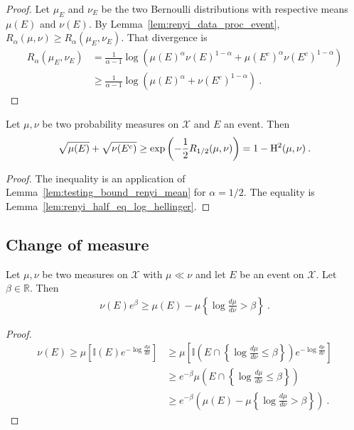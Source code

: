 \begin{proof}
Let $\mu_E$ and $\nu_E$ be the two Bernoulli distributions with respective means $\mu(E)$ and $\nu(E)$.
By Lemma~\ref{lem:renyi_data_proc_event}, $R_\alpha(\mu, \nu) \ge R_\alpha(\mu_E, \nu_E)$. That divergence is
\begin{align*}
R_\alpha(\mu_E, \nu_E)
&= \frac{1}{\alpha - 1}\log \left(\mu(E)^\alpha \nu(E)^{1 - \alpha}
  + \mu(E^c)^\alpha \nu(E^c)^{1 - \alpha}\right)
\\
&\ge \frac{1}{\alpha - 1}\log \left(\mu(E)^\alpha + \nu(E^c)^{1 - \alpha}\right)
\: .
\end{align*}
\end{proof}

\begin{corollary}
  \label{cor:testing_bound_hellinger}
  Let $\mu, \nu$ be two probability measures on $\mathcal X$ and $E$ an event. Then
  \begin{align*}
  \sqrt{\mu(E)} + \sqrt{\nu(E^c)}
  \ge \exp\left(-\frac{1}{2} R_{1/2}(\mu, \nu)\right)
  = 1 - \operatorname{H^2}(\mu, \nu)
  \: .
  \end{align*}
\end{corollary}

\begin{proof}
The inequality is an application of Lemma~\ref{lem:testing_bound_renyi_mean} for $\alpha = 1/2$. The equality is Lemma~\ref{lem:renyi_half_eq_log_hellinger}.
\end{proof}

\subsection{Change of measure}

\begin{lemma}
  \label{lem:llr_change_measure}
  \leanok
  Let $\mu, \nu$ be two measures on $\mathcal X$ with $\mu \ll \nu$ and let $E$ be an event on $\mathcal X$. Let $\beta \in \mathbb{R}$. Then
  \begin{align*}
  \nu(E) e^{\beta} \ge \mu(E) - \mu\left\{ \log\frac{d \mu}{d \nu} > \beta \right\} \: .
  \end{align*}
\end{lemma}

\begin{proof}\leanok
\begin{align*}
\nu(E)
\ge \mu\left[\mathbb{I}(E) e^{- \log\frac{d \mu}{d \nu} }\right]
&\ge \mu\left[\mathbb{I}\left(E \cap \left\{\log\frac{d \mu}{d \nu} \le \beta\right\}\right) e^{- \log\frac{d \mu}{d \nu} }\right]
\\
&\ge e^{- \beta}\mu\left(E \cap \left\{\log\frac{d \mu}{d \nu} \le \beta\right\}\right)
\\
&\ge e^{- \beta}\left( \mu(E) - \mu\left\{ \log\frac{d \mu}{d \nu} > \beta \right\} \right)
\: .
\end{align*}
\end{proof}

